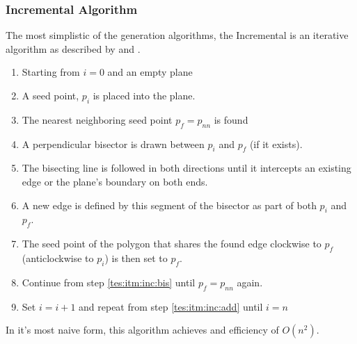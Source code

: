 \subsubsection{Incremental Algorithm}\label{tes:ssec:inc}
The most simplistic of the generation algorithms, the Incremental is an iterative algorithm as described by \citet{green1978computing} and \citet{okabe2009spatial}.
\begin{enumerate}
\item Starting from $i=0$ and an empty plane
\item\label{tes:itm:inc:add} A seed point, $p_i$ is placed into the plane.
\item The nearest neighboring seed point $p_f=p_{nn}$ is found
\item\label{tes:itm:inc:bis} A perpendicular bisector is drawn between $p_i$ and $p_f$ (if it exists).
\item The bisecting line is followed in both directions until it intercepts an existing edge or the plane's boundary on both ends.
\item A new edge is defined by this segment of the bisector as part of both $p_i$ and $p_f$.
\item The seed point of the polygon that shares the found edge clockwise to $p_f$ (anticlockwise to $p_i$) is then set to $p_f$.
\item Continue from step \ref{tes:itm:inc:bis} until $p_f=p_{nn}$ again.
\item Set $i = i +1$ and repeat from step \ref{tes:itm:inc:add} until $i=n$
\end{enumerate}
In it's most naive form, this algorithm achieves and efficiency of $O(n^2)$.
%
